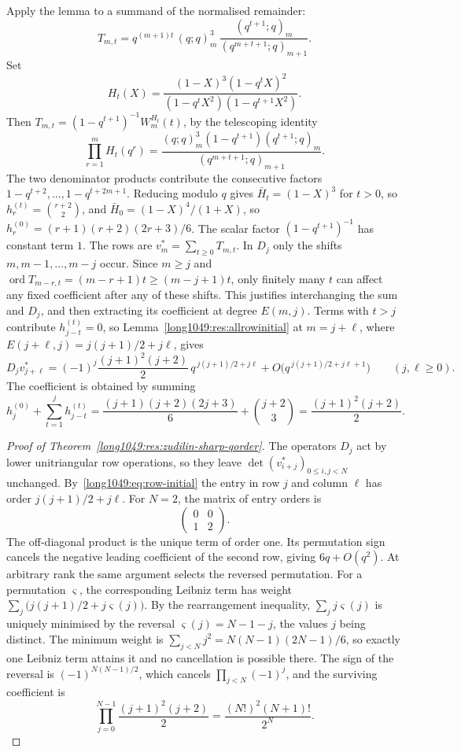 \documentclass[11pt]{article}
\begin{document}
\noindent Apply the lemma to a summand of the normalised remainder:
\[
 T_{m,t}=q^{(m+1)t}\,(q;q)_m^{3}\,\frac{(q^{t+1};q)_m}{(q^{m+t+1};q)_{m+1}} .
\]
Set
\[
 H_t(X)=\frac{(1-X)^{3}(1-q^{t}X)^{2}}{(1-q^{t}X^{2})(1-q^{t+1}X^{2})}.
\]
Then $T_{m,t}=(1-q^{t+1})^{-1}W_m^{H_t}(t)$, by the telescoping identity
\[
 \prod_{r=1}^{m}H_t(q^r)=
 \frac{(q;q)_m^3(1-q^{t+1})(q^{t+1};q)_m}{(q^{m+t+1};q)_{m+1}}.
\]
The two denominator products contribute the consecutive factors
$1-q^{t+2},\ldots,1-q^{t+2m+1}$.
Reducing modulo $q$ gives $\bar H_t=(1-X)^{3}$ for $t>0$, so
$h^{(t)}_r=\binom{r+2}{2}$, and $\bar H_0=(1-X)^{4}/(1+X)$, so
$h^{(0)}_r=(r+1)(r+2)(2r+3)/6$. The scalar factor
$(1-q^{t+1})^{-1}$ has constant term $1$. The rows are $v_m^*=\sum_{t\ge0}T_{m,t}$. In $D_j$ only the shifts
$m,m-1,\ldots,m-j$ occur. Since $m\ge j$ and
$\operatorname{ord}T_{m-r,t}=(m-r+1)t\ge(m-j+1)t$, only finitely many
$t$ can affect any fixed coefficient after any of these shifts.
This justifies interchanging the sum and $D_j$, and then extracting its
coefficient at degree $E(m,j)$. Terms with $t>j$ contribute
$h^{(t)}_{j-t}=0$, so Lemma~\ref{long1049:res:allrowinitial} at
$m=j+\ell$, where $E(j+\ell,j)=j(j+1)/2+j\ell$, gives
\begin{equation}\label{long1049:eq:row-initial}
 D_jv_{j+\ell}^*=(-1)^{j}\frac{(j+1)^{2}(j+2)}2\,q^{\,j(j+1)/2+j\ell}
 +O\bigl(q^{\,j(j+1)/2+j\ell+1}\bigr)
 \qquad(j,\ell\ge0).
\end{equation}
The coefficient is obtained by summing
\[
 h^{(0)}_j+\sum_{t=1}^{j}h^{(t)}_{j-t}
 =\frac{(j+1)(j+2)(2j+3)}6+\binom{j+2}3
 =\frac{(j+1)^{2}(j+2)}2 .
\]

\begin{proof}[Proof of Theorem~\ref{long1049:res:zudilin-sharp-qorder}]
The operators $D_j$ act by lower unitriangular row operations, so they leave
$\det(v_{i+j}^*)_{0\le i,j<N}$ unchanged.  By~\eqref{long1049:eq:row-initial} the entry in
row $j$ and column $\ell$ has order $j(j+1)/2+j\ell$. For $N=2$,
the matrix of entry orders is
\[
 \begin{pmatrix}0&0\\1&2\end{pmatrix}.
\]
The off-diagonal product is the unique term of order one. Its
permutation sign cancels the negative leading coefficient of the second
row, giving $6q+O(q^2)$. At arbitrary rank the same argument selects
the reversed permutation. For a permutation $\varsigma$, the corresponding
Leibniz term has weight $\sum_j\bigl(j(j+1)/2+j\varsigma(j)\bigr)$.
By the rearrangement inequality, $\sum_jj\varsigma(j)$ is uniquely
minimised by the reversal
$\varsigma(j)=N-1-j$, the values $j$ being distinct. The minimum weight is
$\sum_{j<N}j^{2}=N(N-1)(2N-1)/6$, so exactly one Leibniz term attains it and no
cancellation is possible there. The sign of the reversal is
$(-1)^{N(N-1)/2}$, which cancels $\prod_{j<N}(-1)^{j}$, and the surviving
coefficient is
\[
 \prod_{j=0}^{N-1}\frac{(j+1)^{2}(j+2)}2=\frac{(N!)^{2}(N+1)!}{2^{N}} .
\]
\end{proof}
\end{document}
